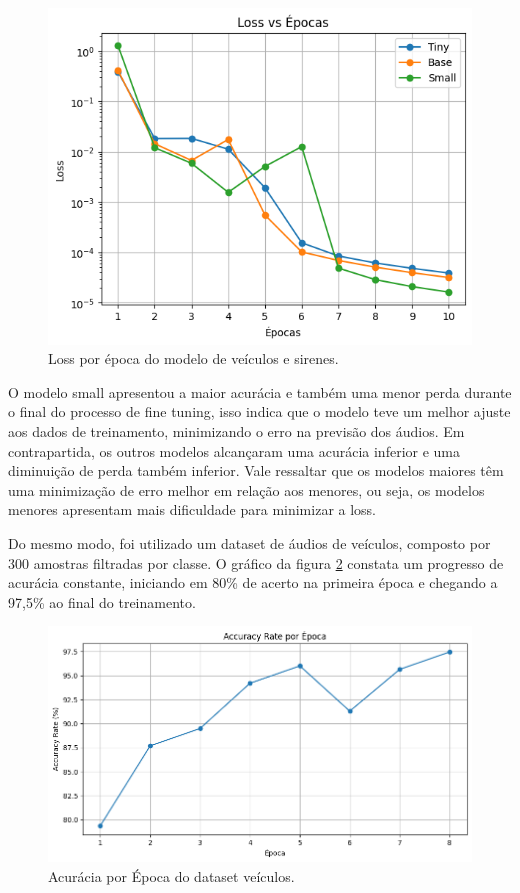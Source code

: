 \documentclass[conference]{IEEEtran}
\begin{document}
\begin{figure}[htbp]
\centerline{\includegraphics[width=\linewidth]{figures/figure3.png}}
\caption{Loss por época do modelo de veículos e sirenes.}
\label{fig3}
\end{figure}

O modelo small apresentou a maior acurácia e também uma menor perda durante o final do processo de fine tuning, isso indica que o modelo teve um melhor ajuste aos dados de treinamento, minimizando o erro na previsão dos áudios. Em contrapartida, os outros modelos alcançaram uma acurácia inferior e uma diminuição de perda também inferior. Vale ressaltar que os modelos maiores têm uma minimização de erro melhor em relação aos menores, ou seja, os modelos menores apresentam mais dificuldade para minimizar a loss.

Do mesmo modo, foi utilizado um dataset de áudios de veículos, composto por 300 amostras filtradas por classe. O gráfico da figura \ref{fig4} constata um progresso de acurácia constante, iniciando em 80\% de acerto na primeira época e chegando a 97,5\% ao final do treinamento.

\begin{figure}[htbp]
\centerline{\includegraphics[width=\linewidth]{figures/figure4.png}}
\caption{Acurácia por Época do dataset veículos.}
\label{fig4}
\end{figure}
\end{document}
